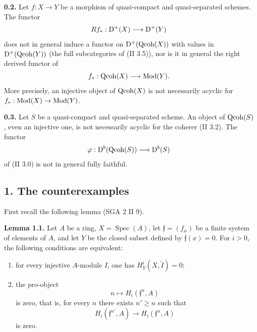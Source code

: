 \documentclass[11pt]{article}
\newcommand{\Spec}{\operatorname{Spec}}
\begin{document}
\textbf{0.2.} Let $f:X\to Y$ be a morphism of quasi-compact and quasi-separated schemes. The functor
\[
Rf_*:\mathrm D^+(X)\longrightarrow\mathrm D^+(Y)
\]
does not in general induce a functor on $\mathrm D^+(\operatorname{Qcoh}(X))$ with values in $\mathrm D^+(\operatorname{Qcoh}(Y))$ (the full subcategories of (II 3.5)), nor is it in general the right derived functor of
\[
f_*:\operatorname{Qcoh}(X)\longrightarrow\operatorname{Mod}(Y).
\]
More precisely, an injective object of $\operatorname{Qcoh}(X)$ is not necessarily acyclic for $f_*:\operatorname{Mod}(X)\to\operatorname{Mod}(Y)$.

\textbf{0.3.} Let $S$ be a quasi-compact and quasi-separated scheme. An object of $\operatorname{Qcoh}(S)$, even an injective one, is not necessarily acyclic for the coherer (II 3.2). The functor
\[
\varphi:\mathrm D^b(\operatorname{Qcoh}(S))\longrightarrow\mathrm D^b(S)
\]
of (II 3.0) is not in general fully faithful.

\subsection*{1. The counterexamples}

First recall the following lemma (SGA 2 II 9).

\textbf{Lemma 1.1.} Let $A$ be a ring, $X=\Spec(A)$, let $\mathfrak f=(f_\alpha)$ be a finite system of elements of $A$, and let $Y$ be the closed subset defined by $\mathfrak f(x)=0$. For $i>0$, the following conditions are equivalent:
\begin{enumerate}[label=(\roman*)]
\item for every injective $A$-module $I$, one has $H_Y^i(X,\widetilde I)=0$;
\item the pro-object
\[
n\longmapsto H_i(\mathfrak f^n,A)
\]
is zero, that is, for every $n$ there exists $n'\geq n$ such that
\[
H_i(\mathfrak f^{n'},A)\longrightarrow H_i(\mathfrak f^n,A)
\]
is zero.
\end{enumerate}
\end{document}
